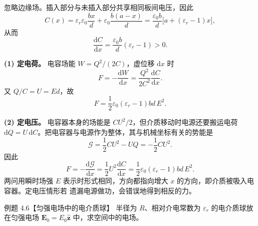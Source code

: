 \dielectricInsertionFigure
{}

\begin{xesolution}
忽略边缘场。插入部分与未插入部分共享相同板间电压，因此
\[
 C(x)=\varepsilon_r\varepsilon_0\frac{bx}{d}
      +\varepsilon_0\frac{b(a-x)}d
 =\frac{\varepsilon_0b}{d}\bigl[a+(\varepsilon_r-1)x\bigr],
\]
从而
\[
 \frac{\mathrm dC}{\mathrm dx}
 =\frac{\varepsilon_0b}{d}(\varepsilon_r-1)>0.
\]

\textbf{(1) 定电荷。} 电容场能 $W=Q^2/(2C)$，虚位移 $\mathrm dx$ 时
\[
 F=-\frac{\mathrm dW}{\mathrm dx}
 =\frac{Q^2}{2C^2}\frac{\mathrm dC}{\mathrm dx}.
\]
又 $Q/C=U=Ed$，故
\[
 \boxed{F=\frac12\varepsilon_0(\varepsilon_r-1)b d\,E^2}.
\]

\textbf{(2) 定电压。} 电容器本身的场能是 $CU^2/2$，但介质移动时电源还要搬运电荷
$\mathrm dQ=U\,\mathrm dC$。把电容器与电源作为整体，其与机械坐标有关的势能是
\[
 \mathcal G=\frac12CU^2-UQ=-\frac12CU^2.
\]
因此
\[
 F=-\frac{\mathrm d\mathcal G}{\mathrm dx}
 =\frac12U^2\frac{\mathrm dC}{\mathrm dx}
 =\boxed{\frac12\varepsilon_0(\varepsilon_r-1)b d\,E^2}.
\]
两问用瞬时场强 $E$ 表示时形式相同，方向都指向增大 $x$ 的方向，即介质被吸入电容器。定电压情形若
遗漏电源做功，会错误地得到相反的力。
\end{xesolution}

\begin{origexamplebox}{例题 4.6【匀强电场中的电介质球】}
半径为 $R$、相对介电常数为 $\varepsilon_r$ 的电介质球放在匀强电场
$\boldsymbol E_0=E_0\hat{\boldsymbol z}$ 中，求空间中的电场。
\end{origexamplebox}

\dielectricSphereFieldFigure
{}

